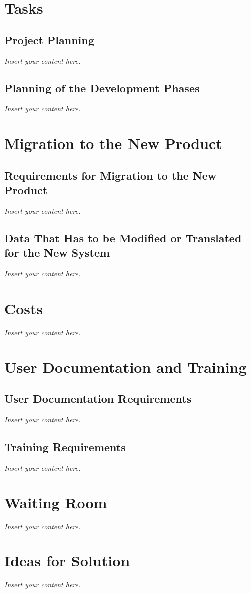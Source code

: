 \documentclass[12pt]{article}
\newcommand{\lips}{\textit{Insert your content here.}}
\begin{document}
\section{Tasks}
\subsection{Project Planning}
\lips
\subsection{Planning of the Development Phases}
\lips

\section{Migration to the New Product}
\subsection{Requirements for Migration to the New Product}
\lips
\subsection{Data That Has to be Modified or Translated for the New System}
\lips

\section{Costs}
\lips
\section{User Documentation and Training}
\subsection{User Documentation Requirements}
\lips
\subsection{Training Requirements}
\lips

\section{Waiting Room}
\lips

\section{Ideas for Solution}
\lips
\end{document}
